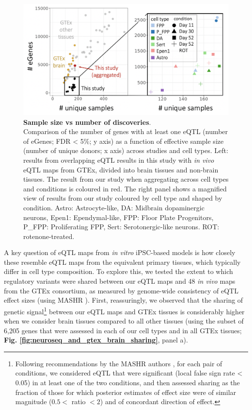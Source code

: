 \begin{figure}[h]
\includegraphics[width=13cm]{Chapter5/Fig/neuroseq_eqtl_gtex_scatterplot.png}
\caption[Sample size vs number of discoveries]{\textbf{Sample size vs number of discoveries}.\\
Comparison of the number of genes with at least one eQTL (number of eGenes; FDR < 5\%; y axis) as a function of effective sample size (number of unique donors; x axis) across studies and cell types. 
Left: results from overlapping eQTL results in this study with \textit{in vivo} eQTL maps from GTEx, divided into brain tissues and non-brain tissues. 
The result from our study when aggregating across cell types and conditions is coloured in red. 
The right panel shows a magnified view of results from our study coloured by cell type and shaped by condition.
Astro: Astrocyte-like, DA: Midbrain dopaminergic neurons, Epen1: Ependymal-like, FPP: Floor Plate Progenitors, P\_FPP: Proliferating FPP, Sert: Serotonergic-like neurons.
ROT: rotenone-treated.}
\label{fig:neuroseq_and_gtex_power}
\end{figure}

\newpage

A key question of eQTL maps from \textit{in vitro} iPSC-based models is how closely these resemble eQTL maps from the equivalent primary tissues, which typically differ in cell type composition. 
To explore this, we tested the extent to which regulatory variants were shared between our eQTL maps and 48 \textit{in vivo} maps from the GTEx consortium, as measured by genome-wide consistency of eQTL effect sizes (using MASHR \cite{urbut2019flexible}).
First, reassuringly, we observed that the sharing of genetic signal\footnote{Following recommendations by the MASHR authors \cite{stephens2020eqtl}, for each pair of conditions, we considered eQTL that were significant (local false sign rate < 0.05) in at least one of the two conditions, and then assessed sharing as the fraction of those for which posterior estimates of effect size were of similar magnitude ($0.5 <$ ratio $<2$) and of concordant direction of effect.} between our eQTL maps and GTEx tissues is considerably higher when we consider brain tissues compared to all other tissues 
(using the subset of 6,205 genes that were assessed in each of our cell types and in all GTEx tissues; \textbf{Fig. \ref{fig:neuroseq_and_gtex_brain_sharing}}, panel a). \\

